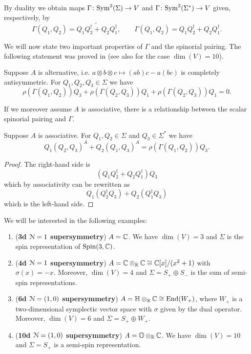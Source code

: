 \documentclass[10pt, oneside]{article}
\begin{document}
By duality we obtain maps $\Gamma\colon{\rm Sym}^2(\Sigma)\rightarrow V$ and $\Gamma\colon {\rm Sym}^2(\Sigma^*)\rightarrow V$ given, respectively, by
\[\Gamma(Q_1, Q_2) = \widetilde{Q_1Q_2^\dagger + Q_2Q_1^\dagger},\qquad \Gamma(Q_1, Q_2) = Q_1Q_2^\dagger + Q_2Q_1^\dagger.\]

We will now state two important properties of $\Gamma$ and the spinorial pairing. The following statement was proved in \cite[Theorem 11]{BaezHuerta} (see also \cite{Schray} for the case $\dim(V)=10$).

\begin{thm}
Suppose $A$ is alternative, i.e. $a\otimes b\otimes c\mapsto (ab)c - a(bc)$ is completely antisymmetric. For $Q_1, Q_2, Q_3\in\Sigma$ we have
\[\rho(\Gamma(Q_1, Q_2))Q_3 + \rho(\Gamma(Q_2, Q_3))Q_1 + \rho(\Gamma(Q_2, Q_3))Q_1 = 0.\]
\label{thm:3psi}
\end{thm}

If we moreover assume $A$ is associative, there is a relationship between the scalar spinorial pairing and $\Gamma$.

\begin{thm}
Suppose $A$ is associative. For $Q_1, Q_2\in\Sigma$ and $Q_3\in\Sigma^*$ we have
\[Q_1(Q_2, Q_3)^A + Q_2(Q_1, Q_3)^A = \rho(\Gamma(Q_1, Q_2)) Q_3.\]
\label{thm:matter3psi}
\end{thm}
\begin{proof}
The right-hand side is
\[(Q_1Q_2^\dagger + Q_2Q_1^\dagger)Q_3\]
which by associativity can be rewritten as
\[Q_1(Q_2^\dagger Q_3) + Q_2(Q_1^\dagger Q_3)\]
which is the left-hand side.
\end{proof}

We will be interested in the following examples:
\begin{enumerate}
\item (\textbf{3d $\mathcal{N}=1$ supersymmetry}) $A = \mathbb C$. We have $\dim(V) = 3$ and $\Sigma$ is the spin representation of $\mathrm{Spin}(3, \mathbb C)$.

\item (\textbf{4d $\mathcal{N}=1$ supersymmetry}) $A = \mathbb C\otimes_{\mathbb R}\mathbb C\cong \mathbb C[x]/(x^2+1)$ with $\sigma(x) = -x$. Moreover, $\dim(V) = 4$ and $\Sigma=S_+\oplus S_-$ is the sum of semi-spin representations.

\item (\textbf{6d $\mathcal{N}=(1, 0)$ supersymmetry}) $A=\mathbb{H}\otimes_{\mathbb R}\mathbb C\cong \operatorname{End}(W_+)$, where $W_+$ is a two-dimensional symplectic vector space with $\sigma$ given by the dual operator. Moreover, $\dim(V) = 6$ and $\Sigma = S_+\oplus W_+$.

\item (\textbf{10d $\mathcal{N}=(1, 0)$ supersymmetry}) $A=\mathbb{O}\otimes_{\mathbb R}\mathbb C$. We have $\dim(V) = 10$ and $\Sigma = S_+$ is a semi-spin representation.
\end{enumerate}
\end{document}
